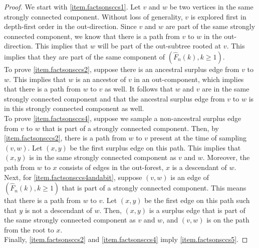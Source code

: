 \begin{proof}
We start with \ref{item.factsonsccs1}. Let $v$ and $w$ be two vertices in the same strongly connected component. Without loss of generality, $v$ is explored first in depth-first order in the out-direction. Since $v$ and $w$ are part of the same strongly connected component, we know that there is a path from $v$ to $w$ in the out-direction. This implies that $w$ will be part of the out-subtree rooted at $v$. This implies that they are part of the same component of $(\hat{F}_n(k),k\geq 1)$. \\
To prove \ref{item.factsonsccs2}, suppose there is an ancestral surplus edge from $v$ to $w$. This implies that $w$ is an ancestor of $v$ in an out-component, which implies that there is a path from $w$ to $v$ as well. It follows that $w$ and $v$ are in the same strongly connected component and that the ancestral surplus edge from $v$ to $w$ is in this strongly connected component as well. \\
To prove \ref{item.factsonsccs4}, suppose we sample a non-ancestral surplus edge from $v$ to $w$ that is part of a strongly connected component. Then, by \ref{item.factsonsccs2}, there is a path from $w$ to $v$ present at the time of sampling $(v,w)$. Let $(x,y)$ be the first surplus edge on this path. This implies that $(x,y)$ is in the same strongly connected component as $v$ and $w$. Moreover, the path from $w$ to $x$ consists of edges in the out-forest, $x$ is a descendant of $w$.\\
Next, for \ref{item.factsonsccs4andabit}, suppose $(v,w)$ is an edge of $(\hat{F}_n(k),k\geq 1)$ that is part of a strongly connected component. This means that there is a path from $w$ to $v$. Let $(x,y)$ be the first edge on this path such that $y$ is not a descendant of $w$. Then, $(x,y)$ is a surplus edge that is part of the same strongly connected component as $v$ and $w$, and $(v,w)$ is on the path from the root to $x$. \\
Finally, \ref{item.factsonsccs2} and \ref{item.factsonsccs4} imply \ref{item.factsonsccs5}. 
\end{proof}

